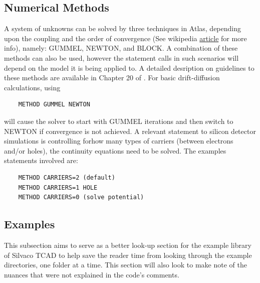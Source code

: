 \documentclass[11pt]{article}
\begin{document}
\subsection{Numerical Methods}
A system of unknowns can be solved by three techniques in Atlas, depending upon the coupling and the order of convergence (See wikipedia \href{https://en.wikipedia.org/wiki/Rate_of_convergence}{article} for more info), namely: GUMMEL, NEWTON, and BLOCK. A combination of these methods can also be used, however the statement calls in such scenarios will depend on the model it is being applied to. A detailed desription on guidelines to these methods are available in Chapter 20 of \cite{silvaco-atlas}. For basic drift-diffusion calculations, using
\begin{verbatim}
    METHOD GUMMEL NEWTON
\end{verbatim}
will cause the solver to start with GUMMEL iterations and then switch to NEWTON if convergence is not achieved.
\newline A relevant statement to silicon detector simulations is controlling forhow many types of carriers (between electrons and/or holes), the continuity equations need to be solved. The examples statements involved are:
\begin{verbatim}
    METHOD CARRIERS=2 (default)
    METHOD CARRIERS=1 HOLE
    METHOD CARRIERS=0 (solve potential)
\end{verbatim}

\subsection{Examples}
This subsection aims to serve as a better look-up section for the example library of Silvaco TCAD to help save the reader time from looking through the example directories, one folder at a time. This section will also look to make note of the nuances that were not explained in the code's comments.
\end{document}
